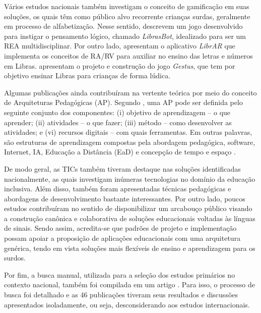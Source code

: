 Vários estudos nacionais também investigam o conceito de gamificação em suas soluções, os quais têm como público alvo recorrente crianças surdas, geralmente em processo de alfabetização. Nesse sentido, \cite{BRA23} descrevem um jogo desenvolvido para instigar o pensamento lógico, chamado \textit{LibrasBot}, idealizado para ser um REA multidisciplinar. Por outro lado,  apresentam o aplicativo \textit{LibrAR} que implementa os conceitos de RA/RV para auxiliar no ensino das letras e números em Libras.  apresentam o projeto e construção do jogo \textit{Gestus}, que tem por objetivo ensinar Libras para crianças de forma lúdica. %

Algumas publicações ainda contribuíram na vertente teórica por meio do conceito de Arquiteturas Pedagógicas (AP). Segundo , uma AP pode ser definida pelo seguinte conjunto dos componentes: (i) objetivo de aprendizagem -- o que aprender; (ii) atividades -- o que fazer; (iii) método -- como desenvolver as atividades; e (vi) recursos digitais -- com quais ferramentas. Em outras palavras, são estruturas de aprendizagem compostas pela abordagem pedagógica, software, Internet, IA, Educação a Distância (EaD) e concepção de tempo e espaço \cite{BRA27}.

De modo geral, as TICs também tiveram destaque nas soluções identificadas nacionalmente, as quais investigam inúmeras tecnologias no domínio da educação inclusiva. Além disso, também foram apresentadas técnicas pedagógicas e abordagens de desenvolvimento bastante interessantes. Por outro lado, poucos estudos contribuíram no sentido de disponibilizar um arcabouço público visando a construção canônica e colaborativa de soluções educacionais voltadas às línguas de sinais. Sendo assim, acredita-se que padrões de projeto e implementação possam apoiar a proposição de aplicações educacionais com uma arquitetura genérica, tendo em vista soluções mais flexíveis de ensino e aprendizagem para os surdos.


Por fim, a busca manual, utilizada para a seleção dos estudos primários no contexto nacional, também foi compilada em um artigo \cite{FalvoJr2020_SBIE}. Para isso, o processo de busca foi detalhado e as 46 publicações tiveram seus resultados e discussões apresentados isoladamente, ou seja, desconsiderando aos estudos internacionais. 

